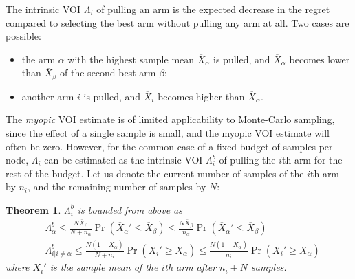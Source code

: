 \documentclass{ecai2012}
\newtheorem{thm}{Theorem}
\begin{document}
The intrinsic VOI $\Lambda_i$ of pulling an arm is the expected decrease
in the regret compared to selecting the best arm without pulling any arm at
all. Two cases are possible:
\begin{itemize}
\item the arm $\alpha$ with the highest sample mean $\overline
  X_\alpha$ is pulled, and $\overline X_\alpha$ becomes lower than
  $\overline X_\beta$ of the second-best arm $\beta$;
\item another arm $i$ is pulled, and $\overline X_i$ becomes higher
than $\overline X_\alpha$.
\end{itemize}
The \textit{myopic} VOI estimate is of limited applicability to
Monte-Carlo sampling, since the effect of a single sample is small,
and the myopic VOI estimate will often be zero. However, for the
common case of a fixed budget of samples per node, $\Lambda_i$ can be
estimated as the intrinsic VOI $\Lambda_i^b$ of pulling the $i$th arm
for the rest of the budget.  Let us denote the current number of
samples of the $i$th arm by $n_i$, and the remaining number of samples
by $N$:
\begin{thm} $\Lambda_i^b$ is bounded from above as
\begin{eqnarray}
\label{eqn:thm-be}
  &\Lambda_\alpha^b \le \frac {N \overline X_\beta} {N+n_\alpha}\Pr(\overline X_\alpha'\le\overline X_\beta)
    \le \frac {N \overline X_\beta} {n_\alpha} \Pr(\overline X_\alpha'\le\overline X_\beta)\\
&\Lambda_{i|i\ne\alpha}^b \le \frac{ N(1-\overline  X_\alpha)} {N+n_i}\Pr(\overline X_i'\ge\overline X_\alpha)
     \le \frac {N(1-\overline X_\alpha)} {n_i}\Pr(\overline   X_i'\ge\overline X_\alpha)\nonumber
\end{eqnarray}
where $\overline X_i'$ is the sample mean of the $i$th arm after $n_i+N$ samples.
\label{thm:be}
\end{thm}
\end{document}
